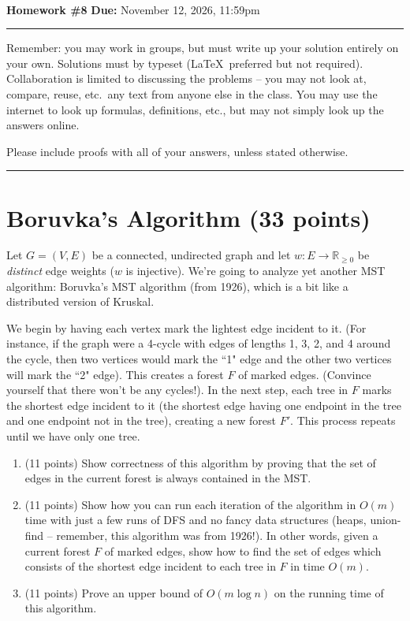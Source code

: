 \documentclass[11pt]{article}
\begin{document}
\\ 
{{\bf Homework \#8}} \hfill {{\bf Due:} November 12, 2026, 11:59pm} \\
\rule[0.1in]{\textwidth}{0.4pt}

Remember: you may work in groups, but must write up your solution entirely on your own.  Solutions must by typeset (\LaTeX\ preferred but not required).  Collaboration is limited to discussing the problems -- you may not look at, compare, reuse, etc.~any text from anyone else in the class.  You may use the internet to look up formulas, definitions, etc., but may not simply look up the answers online.  

Please include proofs with all of your answers, unless stated otherwise.


\noindent \rule[0.1in]{\textwidth}{0.4pt}

\section{Boruvka's Algorithm (33 points)}

Let $G = (V, E)$ be a connected, undirected graph and let $w : E \rightarrow \mathbb{R}_{\geq 0}$ be \emph{distinct} edge weights ($w$ is injective).  We're going to analyze yet another MST algorithm: Boruvka's MST algorithm (from 1926), which is a bit like a distributed version of Kruskal.

We begin by having each vertex mark the lightest edge incident to it. (For instance, if the graph were a 4-cycle with edges of lengths 1, 3, 2, and 4 around the cycle, then two vertices would mark the ``1" edge and the other two vertices will mark the ``2" edge).  This creates a forest $F$ of marked edges. (Convince yourself that there won't be any cycles!). In the next step, each tree in $F$ marks the shortest edge incident to it (the shortest edge having one endpoint in the tree and one endpoint not in the tree), creating a new forest $F'$. This process repeats until we have only one tree.

\begin{enumerate}[resume]
\item (11 points) Show correctness of this algorithm by proving that the set of edges in the current forest is always contained in the MST.

 \item  (11 points) Show how you can run each iteration of the algorithm in $O(m)$ time with just a few runs of DFS and no fancy data structures (heaps, union-find -- remember, this algorithm was from 1926!).  In other words, given a current forest $F$ of marked edges, show how to find the set of edges which consists of the shortest edge incident to each tree in $F$ in time $O(m)$.

\item (11 points) Prove an upper bound of $O(m \log n)$ on the running time of this algorithm.


\end{enumerate}
\end{document}
